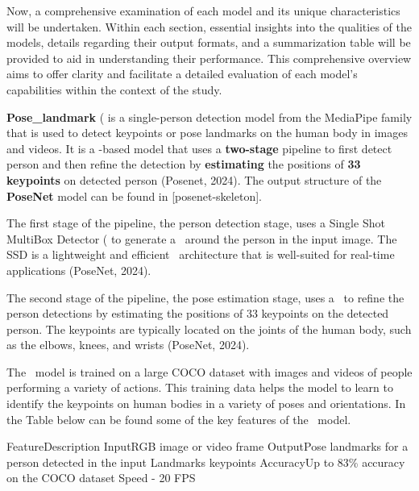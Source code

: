 Now, a comprehensive examination of each model and its unique characteristics will be undertaken. Within each section, essential insights into the qualities of the models, details regarding their output formats, and a summarization table will be provided to aid in understanding their performance. This comprehensive overview aims to offer clarity and facilitate a detailed evaluation of each model's capabilities within the context of the study.

{\bf Pose_landmark} (\PoseNet\) is a single-person detection model from the MediaPipe family that is used to detect keypoints or pose landmarks on the human body in images and videos. It is a \CNN\--based model that uses a {\bf two-stage} pipeline to first detect person {\bf \BBOX} and then refine the detection by {\bf estimating} the positions of {\bf 33} {\bf keypoints} on detected person (\scc Posenet, 2024). The output structure of the {\bf PoseNet} model can be found in [posenet-skeleton].

The first stage of the pipeline, the person detection stage, uses a Single Shot MultiBox Detector (\SSD\) to generate a \BBOX\ around the person in the input image. The SSD is a lightweight and efficient \CNN\ architecture that is well-suited for real-time applications (\scc PoseNet, 2024).

The second stage of the pipeline, the pose estimation stage, uses a \CNN\ to refine the person detections by estimating the positions of 33 keypoints on the detected person. The keypoints are typically located on the joints of the human body, such as the elbows, knees, and wrists (\scc PoseNet, 2024).

The \PoseNet\ model is trained on a large COCO dataset with images and videos of people performing a variety of actions. This training data helps the model to learn to identify the keypoints on human bodies in a variety of poses and orientations. In the Table below can be found some of the key features of the \PoseNet\ model.

    \setupTABLE[r][1][style=bold]
    \setupTABLE[c][each][offset=3dd]
    \setupTABLE[frame=off]
    \setupTABLE[r][1][topframe=on,bottomframe=on]
    \setupTABLE[c][each][leftframe=on]
    \setupTABLE[c][1][leftframe=off]
    \bTR
        \bTD Feature\eTD\bTD    Description\eTD\eTR
    \bTR
        \bTD Input\eTD\bTD      RGB image or video frame\eTD\eTR
    \bTR
            \bTD Output\eTD\bTD     Pose landmarks for a person detected in the input\eTD\eTR
    \bTR
        \bTD Landmarks\eTD{} keypoints\eTD\eTR
    \bTR
        \bTD Accuracy\eTD\bTD   Up to 83\% accuracy on the COCO dataset\eTD\eTR
    \bTR
        \bTD Speed\eTD{} - 20 FPS\eTD\eTR

